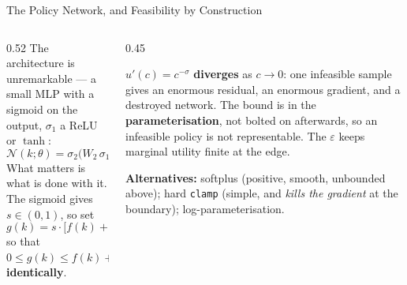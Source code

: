 \begin{frame}{The Policy Network, and Feasibility by Construction}
\begin{columns}[T]
\begin{column}{0.52\textwidth}
\small
The architecture is unremarkable --- a small MLP with a sigmoid on the output, $\sigma_1$ a ReLU or $\tanh$:
\[
  \mathcal{N}(k;\theta)=\sigma_2\bigl(W_2\,\sigma_1(W_1k+b_1)+b_2\bigr).
\]
What matters is what is done with it. The sigmoid gives $s\in(0,1)$, so set
\[
  g(k)=s\cdot\bigl[f(k)+(1-\delta)k-\varepsilon\bigr],
\]
so that $0\le g(k)\le f(k)+(1-\delta)k$ \textbf{identically}.
\end{column}
\begin{column}{0.45\textwidth}
\begin{takeawaybox}[title=\textbf{Why this is not a detail}]\small
$u'(c)=c^{-\sigma}$ \textbf{diverges} as $c\to0$: one infeasible sample gives an enormous residual, an enormous gradient, and a destroyed network.
\medskip
The bound is in the \textbf{parameterisation}, not bolted on afterwards, so an infeasible policy is not representable. The $\varepsilon$ keeps marginal utility finite at the edge.
\end{takeawaybox}
\medskip
{\footnotesize \textbf{Alternatives:} softplus (positive, smooth, unbounded above); hard \texttt{clamp} (simple, and \emph{kills the gradient} at the boundary); log-parameterisation.}
\end{column}
\end{columns}
\vspace{1mm}
\end{frame}

